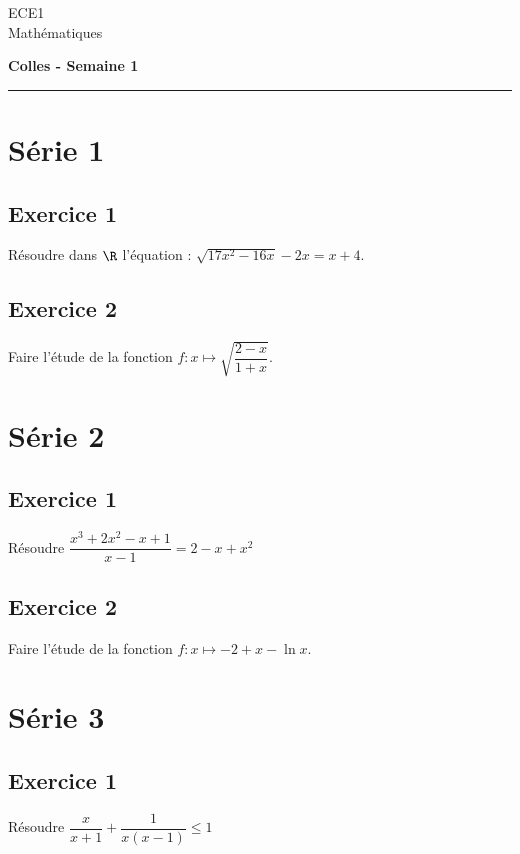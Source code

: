 \documentclass[11pt]{article}%
\begin{document}
\begin{flushleft}
ECE1 \\
Mathématiques
\end{flushleft}

\begin{center}
\textbf{\Large{Colles - Semaine 1}}
\end{center}

\hrule

\vspace*{0,2cm}

\section{Série 1}

\subsection*{Exercice 1}
\noindent
  Résoudre dans $\R$ l'équation : $\sqrt{17x^2-16x} -2x = x+4$.


\subsection*{Exercice 2}
\noindent
Faire l'étude de la fonction $f:x\mapsto \sqrt{\dfrac{2-x}{1+x}}$.



\section{Série 2}

\subsection*{Exercice 1}
\noindent
Résoudre $\dfrac{x^3 + 2x^2 -x +1}{x-1} = 2 - x +x^2$



\subsection*{Exercice 2}
\noindent
Faire l'étude de la fonction $f:x\mapsto -2+x-\ln x$.



\section{Série 3}

\subsection*{Exercice 1}
\noindent
Résoudre $\dfrac{x}{x+1}+ \dfrac{1}{x(x-1)}\leq 1$ 
\end{document}
